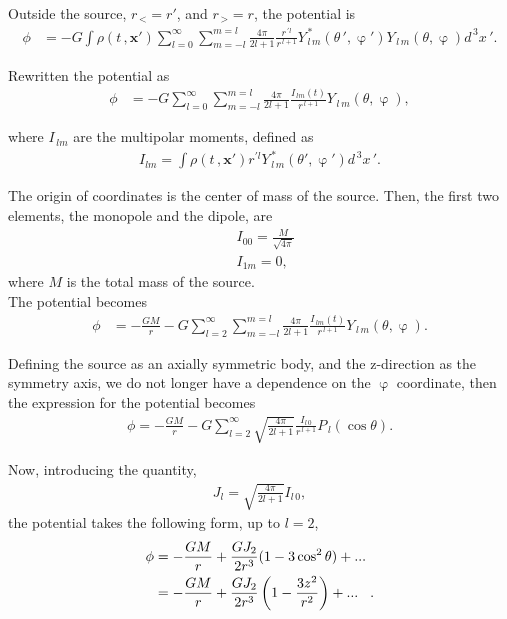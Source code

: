 Outside the source, $r_{\, <} = r'$,  and $r_{\, >} = r$, the potential is
\begin{align}
\phi &= -G \int \rho(t\,, \mathbf{x'}) \sum ^{\infty}_{l =0} \sum ^{m = l}_{m =-l} \frac{4\pi}{2l+1}\frac{r^{\,'l}}{r^{\, l+1}} Y ^ {\,*}_{\,l\,m} (\theta \, ', \upvarphi') Y _{\,l\,m} (\theta, \upvarphi) d^{\,3}x\,'.
\end{align}

Rewritten the potential as
\begin{align}
\phi &=   -G  \sum ^{\infty}_{l =0} \sum ^{m = l}_{m =-l}\frac{4\pi}{2l+1} \frac{I_{\,lm}(t)}{r^{\, l+1}}Y _{\,l\,m} (\theta, \upvarphi),
\end{align}

where $I_{\,lm}$ are the multipolar moments, defined as \cite{GravityPoisson}
\begin{align}
I_{lm} = \int \rho(t\,, \mathbf{x'}) r^{'l}Y ^ {\,*}_{\,l\,m} (\theta', \upvarphi')d^{\,3}x\,'.
\end{align}

The origin of coordinates is the center of mass of the source. Then, the first two elements, the monopole and the dipole, are
\begin{align}
&I_{00} = \frac{M}{\sqrt{4\pi}}\\
&I_{1m} = 0,
\end{align}
where $M$ is the total mass of the source.\\

The potential becomes
\begin{align}
\phi &=   -\frac{GM}{r}  - G \sum ^{\infty}_{l =2} \sum ^{m = l}_{m =-l}\frac{4\pi}{2l+1} \frac{I_{\,lm}(t)}{r^{\, l+1}}Y _{\,l\,m} (\theta, \upvarphi).
\end{align}

Defining the source as an axially symmetric body, and the z-direction as the symmetry axis, we do not longer have a dependence on the $\upvarphi$ coordinate, then the expression for the potential becomes
\begin{align}
\phi = -\frac{GM}{r} - G\sum ^{\infty}_{l =2} \sqrt{\frac{4\pi}{2l+1}} \frac{I_{l\,0}}{r^{\, l+1}}P _{\,l}  (\cos \theta).
\end{align}

Now, introducing the quantity,
\begin{align}
J_l = \sqrt{\frac{4\pi}{2l+1}} I_{l\,0},
\label{eq: definitionJl}
\end{align}
the potential takes the following form, up to $l=2$,
\begin{align*}
\phi &= -\frac{GM}{r} + \frac{GJ_2}{2r^3}(1-3\cos^2\theta) + ...\\
&=-\frac{GM}{r} + \frac{GJ_2}{2r^3}\left(1-\frac{3z^2}{r^2}\right) + ... \hspace{0.3cm}.
\end{align*}

